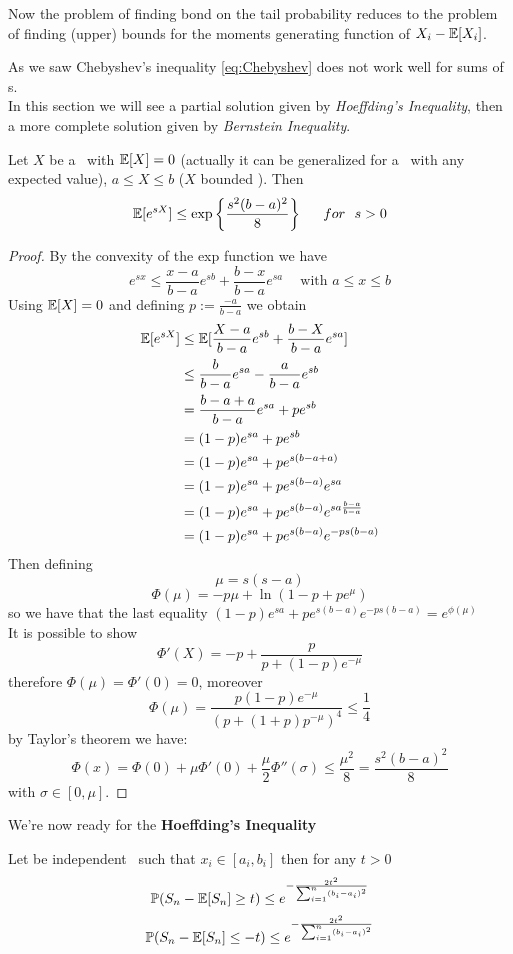 Now the problem of finding bond on the tail probability reduces to the problem of finding (upper) bounds for the moments generating function of $X_i-\mathbb{E}[X_i]$.


As we saw Chebyshev's inequality \ref{eq:Chebyshev} does not work well for sums of \rv s.\\
In this section we will see a partial solution given by \textit{Hoeffding's Inequality}, then a more complete solution given by \textit{Bernstein Inequality}.

\begin{lem}\label{lem:Hoeffding}
	Let $X$ be a \rv  \   with $\mathbb{E} [X]=0$ (actually it can be generalized for a \rv \  with any expected value), $a\leq X \leq b$ ($X$ bounded \rv). Then
	\[
	\e[e^{sX}] \leq \exp \bigg\{\frac{s^2(b-a)^2}{8} \bigg\}\ \ \ \ \ for  \ \ s>0
	\]
\end{lem}

\begin{proof}
	By the convexity of the exp function we have 
	\[
	e^{sx} \leq \frac{x-a}{b-a}e^{sb}+\frac{b-x}{b-a}e^{sa} \ \ \ \  \text{     with $a\leq x\leq b$}
	\]
	Using $\mathbb{E}[X]=0$ and defining $p:=\frac{-a}{b-a}$ we obtain
	\[
	\begin{split}
		\mathbb{E}[e^{sX}]
		&\leq \mathbb{E}[\frac{X-a}{b-a}e^{sb}+\frac{b-X}{b-a}e^{sa} ]\\
		& \leq \frac{b}{b-a}e^{sa}-\frac{a}{b-a}e^{sb}\\
		& =\frac{b-a+a}{b-a}e^{sa}+pe^{sb}\\
		&= (1-p)e^{sa}+pe^{sb}\\
		&= (1-p)e^{sa}+pe^{s(b-a+a)}\\
		&= (1-p)e^{sa}+pe^{s(b-a)}e^{sa}\\
		&= (1-p)e^{sa}+pe^{s(b-a)}e^{sa\frac{b-a}{b-a}}\\
		&= (1-p)e^{sa}+pe^{s(b-a)}e^{-ps(b-a)}
	\end{split}
	\]
	Then defining 
	$$\mu=s(s-a)$$
	$$\Phi(\mu)=-p\mu + \ln(1-p+pe^{\mu})$$
	so we have that the last equality $(1-p)e^{sa}+pe^{s(b-a)}e^{-ps(b-a)}=e^{\phi(\mu)}$\\
	It is possible to show 
	$$\Phi'(X)=-p +\frac{p}{p+(1-p)e^{-\mu}}$$
	therefore $\Phi(\mu)=\Phi'(0)=0$, moreover
	$$\Phi(\mu)=\frac{p(1-p)e^{-\mu}}{(p+(1+p)p^{-\mu})^4}\leq \frac{1}{4}$$
	by Taylor's theorem we have:
	$$\Phi(x)=\Phi(0)+\mu\Phi'(0)+\frac{\mu}{2}\Phi''(\sigma)\leq \frac{\mu^2}{8}=\frac{s^2(b-a)^2}{8}$$
	with $\sigma \in [0,\mu]$.
\end{proof}
We're now ready for the \textbf{Hoeffding's Inequality}
\begin{teo}
	Let \xii be independent \rv \ such that $x_i\in[a_i,b_i]$ then for any $t>0$
	$$\mathbb{P}(S_n-\mathbb{E}[S_n]\geq t)\leq e^{-\frac{2t^2}{\sum_{i=1}^{n}(b_i-a_i)^2}}$$
	$$\mathbb{P}(S_n-\mathbb{E}[S_n]\leq -t)\leq e^{-\frac{2t^2}{\sum_{i=1}^{n}(b_i-a_i)^2}}$$
\end{teo}


